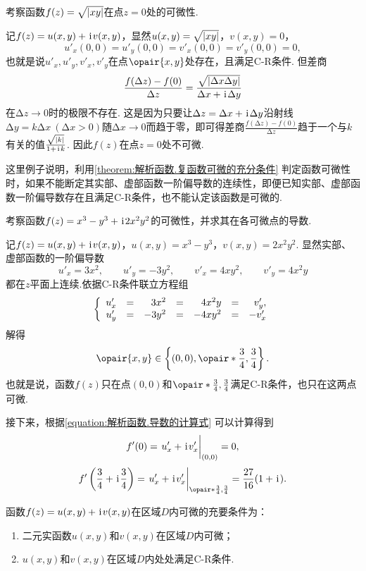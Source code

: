 \begin{example}
考察函数\(f(z) = \sqrt{\abs{xy}}\)在点\(z = 0\)处的可微性.
\begin{solution}
记\(f(z) = u(x,y) + \kern1pt\mathrm{i}\kern1pt v(x,y)\)，显然\(u(x,y) = \sqrt{\abs{xy}}\)，\(v(x,y) = 0\)，\[
u'_x(0,0) = u'_y(0,0) = v'_x(0,0) = v'_y(0,0) = 0,
\]也就是说\(u'_x,u'_y,v'_x,v'_y\)在点\(\opair{x,y}\)处存在，且满足C-R条件.
但差商\[
\frac{f(\Delta z) - f(0)}{\Delta z}
= \frac{ \sqrt{ \abs{ \Delta x \Delta y } } }{ \Delta x + \kern1pt\mathrm{i}\kern1pt \Delta y }
\]在\(\increment z \to 0\)时的极限不存在.
这是因为只要让\(\Delta z = \Delta x + \kern1pt\mathrm{i}\kern1pt \Delta y\)沿射线\(\increment y = k \increment x \ (\increment x > 0)\)随\(\increment x \to 0\)而趋于零，即可得差商\(\frac{f(\increment z) - f(0)}{\increment z}\)趋于一个与\(k\)有关的值\(\frac{\sqrt{\abs{k}}}{1 + \kern1pt\mathrm{i}\kern1pt k}\).
因此\(f(z)\)在点\(z = 0\)处不可微.
\end{solution}
这里例子说明，利用\cref{theorem:解析函数.复函数可微的充分条件} 判定函数可微性时，如果不能断定其实部、虚部函数一阶偏导数的连续性，即便已知实部、虚部函数一阶偏导数存在且满足C-R条件，也不能认定该函数是可微的.
\end{example}

\begin{example}
考察函数\(f(z) = x^3 - y^3 + \kern1pt\mathrm{i}\kern1pt 2 x^2 y^2\)的可微性，并求其在各可微点的导数.
\begin{solution}
记\(f(z) = u(x,y) + \kern1pt\mathrm{i}\kern1pt v(x,y)\)，\(u(x,y) = x^3 - y^3\)，\(v(x,y) = 2 x^2 y^2\).
显然实部、虚部函数的一阶偏导数\[
u'_x = 3x^2,
\qquad
u'_y = -3y^2,
\qquad
v'_x = 4xy^2,
\qquad
v'_y = 4x^2y
\]都在\(z\)平面上连续.依据C-R条件联立方程组\[
\left\{ \begin{array}{*7r}
u'_x &=& 3x^2 &=& 4x^2y &=& v'_y, \\
u'_y &=& -3y^2 &=& -4xy^2 &=& -v'_x
\end{array} \right.
\]解得\[
\opair{x,y}\in\left\{ (0,0), \opair*{\frac{3}{4},\frac{3}{4}} \right\}.
\]也就是说，函数\(f(z)\)只在点\((0,0)\)和\(\opair*{\frac{3}{4},\frac{3}{4}}\)满足C-R条件，也只在这两点可微.

接下来，根据\cref{equation:解析函数.导数的计算式} 可以计算得到\[
f'(0) = \eval{u'_x + \iu v'_x}_{(0,0)} = 0,
\]\[
f'\left(\frac{3}{4}+\iu\frac{3}{4}\right)
= \eval{u'_x + \iu v'_x}_{\opair*{\frac{3}{4},\frac{3}{4}}}
= \frac{27}{16} (1+\iu).
\]
\end{solution}
\end{example}

\begin{theorem}\label{theorem:解析函数.函数在区域内处处可微的条件}
函数\(f(z)=u(x,y)+\kern1pt\mathrm{i}\kern1pt v(x,y)\)在区域\(D\)内可微的充要条件为：
\begin{enumerate}
\item 二元实函数\(u(x,y)\)和\(v(x,y)\)在区域\(D\)内可微；
\item \(u(x,y)\)和\(v(x,y)\)在区域\(D\)内处处满足C-R条件.
\end{enumerate}
\end{theorem}

